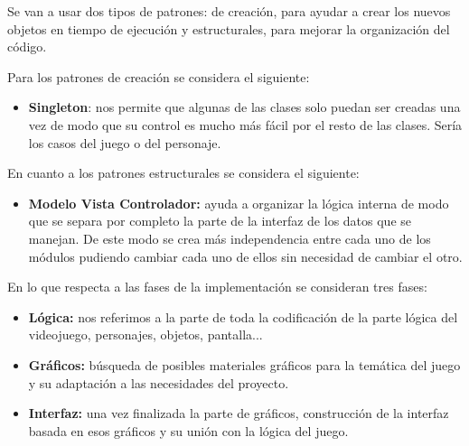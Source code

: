 \documentclass[palatino]{apuntes}
\begin{document}
Se van a usar dos tipos de patrones: de creación, para ayudar a crear los nuevos objetos en tiempo de ejecución y estructurales, para mejorar la organización del código.

Para los patrones de creación se considera el siguiente:
\begin{itemize}
	\item \textbf{Singleton}: nos permite que algunas de las clases solo puedan ser creadas una vez de modo que su control es mucho más fácil por el resto de las clases. Sería los casos del juego o del personaje.
\end{itemize}

En cuanto a los patrones estructurales se considera el siguiente:
\begin{itemize}
	\item \textbf{Modelo Vista Controlador:} ayuda a organizar la lógica interna de modo que se separa por completo la parte de la interfaz de los datos que se manejan. De este modo se crea más independencia entre cada uno de los módulos pudiendo cambiar cada uno de ellos sin necesidad de cambiar el otro.
\end{itemize}

En lo que respecta a las fases de la implementación se consideran tres fases:

\begin{itemize}
	\item \textbf{Lógica:} nos referimos a la parte de toda la codificación de la parte lógica del videojuego, personajes, objetos, pantalla...
	\item \textbf{Gráficos:} búsqueda de posibles materiales gráficos para la temática del juego y su adaptación a las necesidades del proyecto.
	\item \textbf{Interfaz:} una vez finalizada la parte de gráficos, construcción de la interfaz basada en esos gráficos y su unión con la lógica del juego.
\end{itemize}
\end{document}
